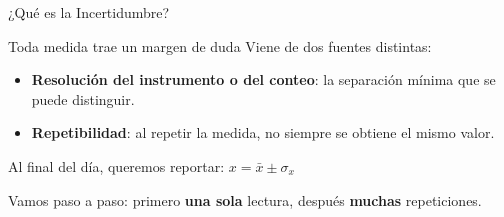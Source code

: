 \documentclass[aspectratio=169,xcolor=dvipsnames]{beamer}
\begin{document}
\begin{frame}{¿Qué es la Incertidumbre?}
	\begin{block}{Toda medida trae un margen de duda}
		\centering
		Viene de dos fuentes distintas:
	\end{block}

	\vspace{0.3cm}
	\begin{itemize}
		\setlength{\itemsep}{10pt}
		\item \textbf{Resolución del instrumento o del conteo}: la separación mínima que se puede distinguir.
		\item \textbf{Repetibilidad}: al repetir la medida, no siempre se obtiene el mismo valor.
	\end{itemize}

	\vspace{0.4cm}
	\begin{exampleblock}{Al final del día, queremos reportar:}
		\centering
		\Large $x = \bar{x} \pm \sigma_x$
	\end{exampleblock}

	\vspace{0.2cm}
	\begin{center}
		\small Vamos paso a paso: primero \textbf{una sola} lectura, después \textbf{muchas} repeticiones.
	\end{center}
\end{frame}
\end{document}
